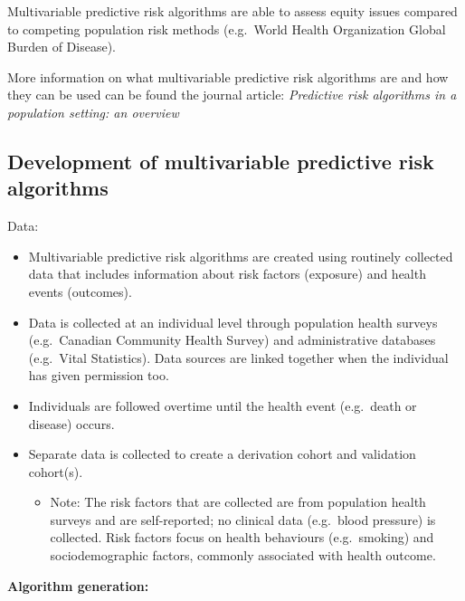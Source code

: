 \documentclass[]{book}
\providecommand{\tightlist}{%
  \setlength{\itemsep}{0pt}\setlength{\parskip}{0pt}}
\begin{document}
Multivariable predictive risk algorithms are able to assess equity
issues compared to competing population risk methods (e.g.~World Health
Organization Global Burden of Disease).

More information on what multivariable predictive risk algorithms are
and how they can be used can be found the journal article:
\emph{Predictive risk algorithms in a population setting: an overview}
\citep{PoRTover}

\subsection{Development of multivariable predictive risk
algorithms}\label{development-of-multivariable-predictive-risk-algorithms}

Data:

\begin{itemize}
\item
  Multivariable predictive risk algorithms are created using routinely
  collected data that includes information about risk factors (exposure)
  and health events (outcomes).
\item
  Data is collected at an individual level through population health
  surveys (e.g.~Canadian Community Health Survey) and administrative
  databases (e.g.~Vital Statistics). Data sources are linked together
  when the individual has given permission too.
\item
  Individuals are followed overtime until the health event (e.g.~death
  or disease) occurs.
\item
  Separate data is collected to create a derivation cohort and
  validation cohort(s).

  \begin{itemize}
  \tightlist
  \item
    Note: The risk factors that are collected are from population health
    surveys and are self-reported; no clinical data (e.g.~blood
    pressure) is collected. Risk factors focus on health behaviours
    (e.g.~smoking) and sociodemographic factors, commonly associated
    with health outcome.
  \end{itemize}
\end{itemize}

\textbf{Algorithm generation:}
\end{document}
